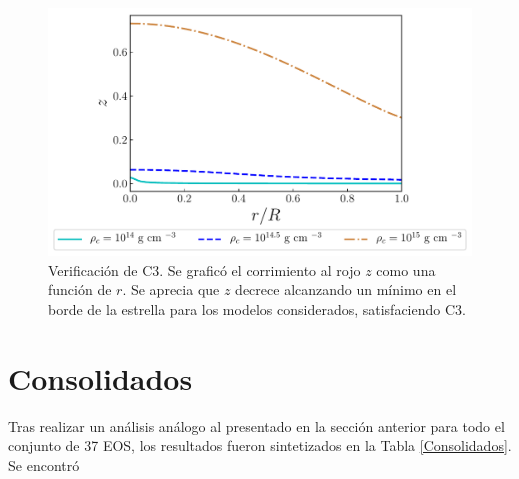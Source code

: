 \begin{figure}[H]
    \centering
    \includegraphics[width=0.93\linewidth]{figures/Redshifteng.pdf}
    \caption{Verificación de C3. Se graficó el corrimiento al rojo $z$ como una función de $r$. Se aprecia que $z$ decrece alcanzando un mínimo en el borde de la estrella para los modelos considerados, satisfaciendo C3.}
    \label{Redshifteng}
\end{figure}

\section{Consolidados}

Tras realizar un análisis análogo al presentado en la sección anterior para todo el conjunto de 37 EOS, los resultados fueron sintetizados en la Tabla \ref{Consolidados}. Se encontró

